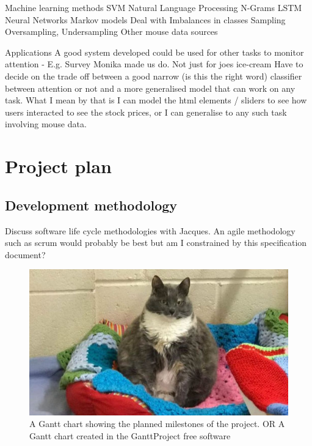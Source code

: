 \documentclass{article}
\begin{document}
Machine learning methods
    SVM
    Natural Language Processing
    N-Grams
    LSTM Neural Networks
    Markov models
Deal with Imbalances in classes
    Sampling
    Oversampling, Undersampling
Other mouse data sources

Applications
A good system developed could be used for other tasks to monitor attention - E.g. Survey Monika made us do. Not just for joes ice-cream
Have to decide on the trade off between a good narrow (is this the right word) classifier between attention or not and a more generalised model that can work on any task.
What I mean by that is I can model the html elements / sliders to see how users interacted to see the stock prices, or I can generalise to any such task involving mouse data.

\section{Project plan}

\subsection{Development methodology}
Discuss software life cycle methodologies with Jacques.
An agile methodology such as scrum would probably be best but am I constrained  by this specification document?

\begin{figure}[ht]
    \centering
    \includegraphics[scale=0.35]{Test.JPG}
    \caption{A Gantt chart showing the planned milestones of the project. OR A Gantt chart created in the GanttProject free software}
    \label{fig:Gantt}
\end{figure}
\end{document}
